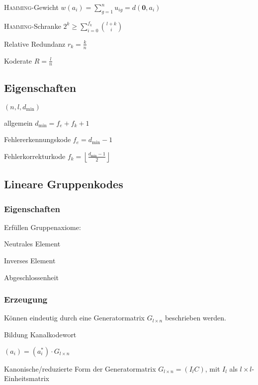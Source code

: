 \documentclass[8pt,a4paper,landscape]{extarticle}
\begin{document}
\begin{multicols*}{6}
\textsc{Hamming}-Gewicht $w(a_i) = \sum_{g=1}^n u_{ig} = d(\mathbf{0}, a_i)$

\textsc{Hamming}-Schranke $\boxed{2^k \ge \sum_{i=0}^{f_k} \binom{l+k}{i}}$

Relative Redundanz $r_k = \frac{k}{n}$

Koderate $R = \frac{l}{n}$

\subsection{Eigenschaften}
$(n, l, d_\text{min})$

allgemein $d_\text{min} = f_e + f_k + 1$

Fehlererkennungskode $\boxed{f_e = d_\text{min} - 1}$

Fehlerkorrekturkode $\boxed{f_k = \left\lfloor \frac{d_\text{min} - 1}{2} \right\rfloor}$

\subsection{Lineare Gruppenkodes}
\justifying
\subsubsection{Eigenschaften}
Erfüllen Gruppenaxiome:
\begin{compactenum}
	\item Neutrales Element
	\item Inverses Element
	\item Abgeschlossenheit
\end{compactenum}

\subsubsection{Erzeugung}
Können eindeutig durch eine Generatormatrix $G_{l \times n}$ beschrieben werden.

Bildung Kanalkodewort

$\boxed{(a_i) = (a_i^{*}) \cdot G_{l \times n}}$

Kanonische/reduzierte Form der Generatormatrix $G_{l \times n} = (I_l C)$, mit $I_l$ als $l\times l$-Einheitsmatrix


\end{multicols*}
\end{document}
